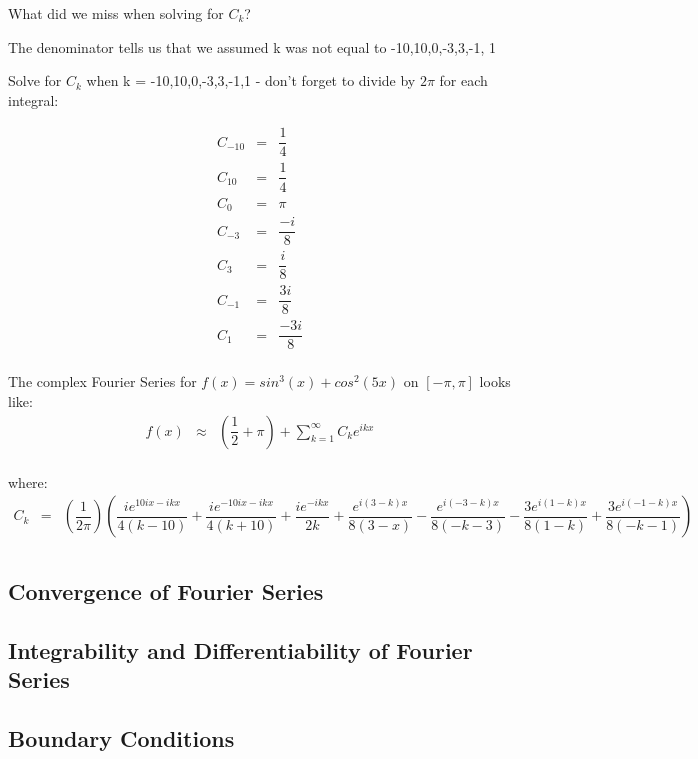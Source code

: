 \documentclass{article}
\newcommand{\bea}{\begin{eqnarray*}}
\newcommand{\eea}{\end{eqnarray*}}
\newcommand{\red}[1]{\textcolor{red}{#1}}
\newcommand{\blue}[1]{\textcolor{blue}{#1}}
\begin{document}
What did we miss when solving for $C_k$?\newline

The denominator tells us that we assumed k was not equal to -10,10,0,-3,3,-1, 1\newline

Solve for $C_k$ when k = -10,10,0,-3,3,-1,1 - don't forget to divide by $2\pi$ for each integral:\newline

\bea
C_{-10} &=& \dfrac{1}{4} \\
C_10 &=& \dfrac{1}{4} \\
C_0 &=& \pi \\
C_{-3} &=& \dfrac{-i}{8} \\
C_3 &=& \dfrac{i}{8}\\
C_{-1} &=& \dfrac{3i}{8} \\
C_1 &=& \dfrac{-3i}{8}\\
\eea

The complex Fourier Series for $f(x) = sin^3(x)+cos^2(5x)$ on $[-\pi,\pi]$ looks like:
\bea
f(x) &\approx& (\dfrac{1}{2}+\pi) + \sum_{k=1}^{\infty} C_ke^{ikx} \\
\eea

where:
\bea
C_k &=& (\dfrac{1}{2\pi})(\dfrac{ie^{10ix-ikx}}{4(k-10)} + \dfrac{ie^{-10ix-ikx}}{4(k+10)} + \dfrac{ie^{-ikx}}{2k} + \dfrac{e^{i(3-k)x}}{8(3-x)} - \dfrac{e^{i(-3-k)x}}{8(-k-3)} - \dfrac{3e^{i(1-k)x}}{8(1-k)} + \dfrac{3e^{i(-1-k)x}}{8(-k-1)}) \\
\eea


\subsection{Convergence of Fourier Series}

\subsection{Integrability and Differentiability of Fourier Series}

\subsection{Boundary Conditions}
\end{document}
